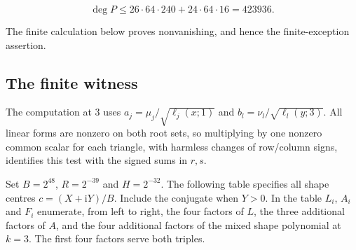 \documentclass[11pt,letterpaper]{article}
\theoremstyle{definition}
\begin{document}
\[
\deg P \le 26\cdot64\cdot240+24\cdot64\cdot16=423936.
\]

The finite calculation below proves nonvanishing, and hence the finite-exception assertion.

\subsection*{The finite witness}

The computation at 3 uses \(a_j=\mu_j/\sqrt{\ell_j(x;1)}\) and \(b_l=\nu_l/\sqrt{\ell_l(y;3)}\). All linear forms are nonzero on both root sets, so multiplying by one nonzero common scalar for each triangle, with harmless changes of row/column signs, identifies this test with the signed sums in \(r,s\).

Set $B=2^{48}$, $R=2^{-39}$ and $H=2^{-32}$. The following table specifies all shape centres $c=(X+\mathrm{i}Y)/B$. Include the conjugate when $Y>0$. In the table $L_i$, $A_i$ and $F_i$ enumerate, from left to right, the four factors of $L$, the three additional factors of $A$, and the four additional factors of the mixed shape polynomial at $k=3$. The first four factors serve both triples.
\end{document}
